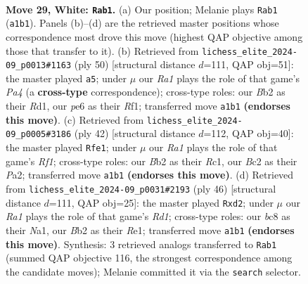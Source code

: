 \documentclass[11pt]{article}
\begin{document}
\begin{figure}[p]
\label{fig:thought-m54}
\end{figure}

\clearpage

\begin{figure}[p]\centering
\begin{subfigure}{0.46\textwidth}\centering
\resizebox{\linewidth}{!}{%
\newchessgame
\chessboard[
  setfen={1nb5/rp1n2k1/p3ppp1/3r3p/1bN5/1P2P1PP/PBB1PK2/R2R4 w - - 3 29},
  showmover=false,
  pgfstyle=straightmove, color=movearrow, markmove={a1-b1}
]}
\caption{}
\end{subfigure}\hfill
\begin{subfigure}{0.46\textwidth}\centering
\resizebox{\linewidth}{!}{%
\newchessgame
\chessboard[
  setfen={3bkn1r/1p1r1pp1/1Bpp3n/4p2p/P3P3/1BN2P2/1PP3P1/3R1RK1 w k - 1 26},
  showmover=false,
  pgfstyle=straightmove, color=movearrow, markmove={a4-a5}
]}
\caption{}
\end{subfigure}
\\[4pt]
\begin{subfigure}{0.46\textwidth}\centering
\resizebox{\linewidth}{!}{%
\newchessgame
\chessboard[
  setfen={2b1r1k1/4bppp/1r2pn2/N1pnN3/3p4/1P1P2P1/P2B1PBP/2R2RK1 w - - 1 22},
  showmover=false,
  pgfstyle=straightmove, color=movearrow, markmove={f1-e1}
]}
\caption{}
\end{subfigure}\hfill
\begin{subfigure}{0.46\textwidth}\centering
\resizebox{\linewidth}{!}{%
\newchessgame
\chessboard[
  setfen={r4rk1/1p1bn1pp/2n1p3/1N1p4/p5B1/P7/1PPb2PP/N1KRR3 w - - 0 24},
  showmover=false,
  pgfstyle=straightmove, color=movearrow, markmove={d1-d2}
]}
\caption{}
\end{subfigure}
\caption{\textbf{Move 29, White: \texttt{Rab1}.} (a) Our position; Melanie plays \texttt{Rab1} (\texttt{a1b1}). Panels (b)--(d) are the retrieved master positions whose correspondence most drove this move (highest QAP objective among those that transfer to it). (b) Retrieved from \texttt{lichess\_elite\_2024-09\_p0013\#1163} (ply 50) [structural distance $d$=111, QAP obj=51]: the master played \texttt{a5}; under $\mu$ our \emph{Ra1} plays the role of that game's \emph{Pa4} (a \textbf{cross-type} correspondence); cross-type roles: our \emph{B}b2 as their \emph{R}d1, our \emph{p}e6 as their \emph{R}f1; transferred move \texttt{a1b1} \textbf{(endorses this move)}. (c) Retrieved from \texttt{lichess\_elite\_2024-09\_p0005\#3186} (ply 42) [structural distance $d$=112, QAP obj=40]: the master played \texttt{Rfe1}; under $\mu$ our \emph{Ra1} plays the role of that game's \emph{Rf1}; cross-type roles: our \emph{B}b2 as their \emph{R}c1, our \emph{B}c2 as their \emph{P}a2; transferred move \texttt{a1b1} \textbf{(endorses this move)}. (d) Retrieved from \texttt{lichess\_elite\_2024-09\_p0031\#2193} (ply 46) [structural distance $d$=111, QAP obj=25]: the master played \texttt{Rxd2}; under $\mu$ our \emph{Ra1} plays the role of that game's \emph{Rd1}; cross-type roles: our \emph{b}c8 as their \emph{N}a1, our \emph{B}b2 as their \emph{R}e1; transferred move \texttt{a1b1} \textbf{(endorses this move)}. Synthesis: 3 retrieved analogs transferred to \texttt{Rab1} (summed QAP objective 116, the strongest correspondence among the candidate moves); Melanie committed it via the \texttt{search} selector.}

\end{figure}
\end{document}
